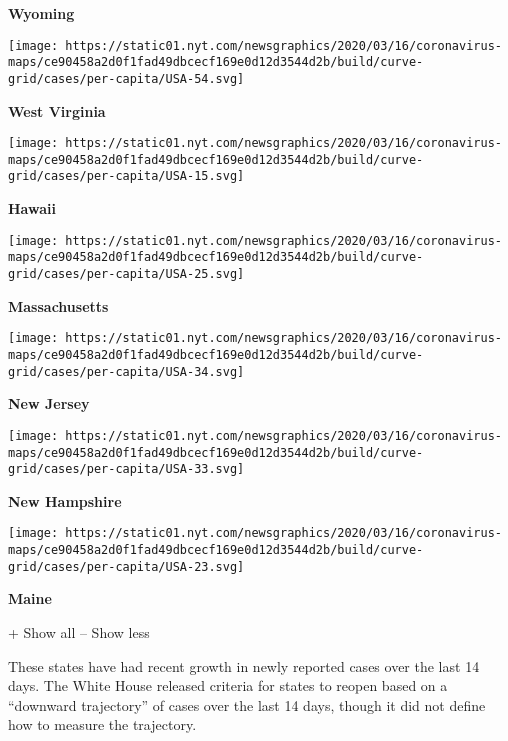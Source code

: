 \textbf{Wyoming}

\href{https://www.nytimes.com/interactive/2020/us/west-virginia-coronavirus-cases.html}{}

\texttt{[image: https://static01.nyt.com/newsgraphics/2020/03/16/coronavirus-maps/ce90458a2d0f1fad49dbcecf169e0d12d3544d2b/build/curve-grid/cases/per-capita/USA-54.svg]}

\textbf{West Virginia}

\href{https://www.nytimes.com/interactive/2020/us/hawaii-coronavirus-cases.html}{}

\texttt{[image: https://static01.nyt.com/newsgraphics/2020/03/16/coronavirus-maps/ce90458a2d0f1fad49dbcecf169e0d12d3544d2b/build/curve-grid/cases/per-capita/USA-15.svg]}

\textbf{Hawaii}

\href{https://www.nytimes.com/interactive/2020/us/massachusetts-coronavirus-cases.html}{}

\texttt{[image: https://static01.nyt.com/newsgraphics/2020/03/16/coronavirus-maps/ce90458a2d0f1fad49dbcecf169e0d12d3544d2b/build/curve-grid/cases/per-capita/USA-25.svg]}

\textbf{Massachusetts}

\href{https://www.nytimes.com/interactive/2020/us/new-jersey-coronavirus-cases.html}{}

\texttt{[image: https://static01.nyt.com/newsgraphics/2020/03/16/coronavirus-maps/ce90458a2d0f1fad49dbcecf169e0d12d3544d2b/build/curve-grid/cases/per-capita/USA-34.svg]}

\textbf{New Jersey}

\href{https://www.nytimes.com/interactive/2020/us/new-hampshire-coronavirus-cases.html}{}

\texttt{[image: https://static01.nyt.com/newsgraphics/2020/03/16/coronavirus-maps/ce90458a2d0f1fad49dbcecf169e0d12d3544d2b/build/curve-grid/cases/per-capita/USA-33.svg]}

\textbf{New Hampshire}

\href{https://www.nytimes.com/interactive/2020/us/maine-coronavirus-cases.html}{}

\texttt{[image: https://static01.nyt.com/newsgraphics/2020/03/16/coronavirus-maps/ce90458a2d0f1fad49dbcecf169e0d12d3544d2b/build/curve-grid/cases/per-capita/USA-23.svg]}

\textbf{Maine}

+ Show all -- Show less

These states have had recent growth in newly reported cases over the
last 14 days. The White House released criteria for states to reopen
based on a ``downward trajectory'' of cases over the last 14 days,
though it did not define how to measure the trajectory.

